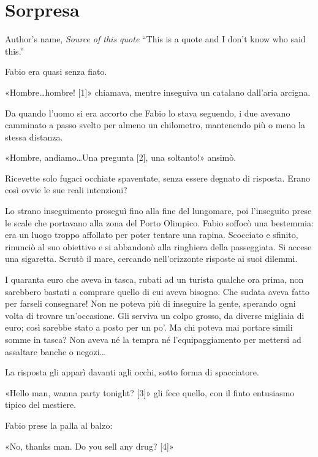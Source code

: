 \chapter{Sorpresa}

\begin{chapquote}{Author's name, \textit{Source of this quote}}
``This is a quote and I don't know who said this.''
\end{chapquote}



Fabio era quasi senza fiato.

«Hombre\ldots hombre! [1]» chiamava, mentre inseguiva un catalano dall'aria arcigna. 

Da quando l'uomo si era accorto che Fabio lo stava seguendo, i due avevano camminato a passo svelto per almeno un chilometro, mantenendo più o meno la stessa distanza.

«Hombre, andiamo\ldots Una pregunta [2], una soltanto!» ansimò. 

Ricevette solo fugaci occhiate spaventate, senza essere degnato di risposta. Erano così ovvie le sue reali intenzioni?

Lo strano inseguimento proseguì fino alla fine del lungomare, poi l'inseguito prese le scale che portavano alla zona del Porto Olimpico. Fabio soffocò una bestemmia: era un luogo troppo affollato per poter tentare una rapina. Scocciato e sfinito, rinunciò al suo obiettivo e si abbandonò alla ringhiera della passeggiata. Si accese una sigaretta. Scrutò il mare, cercando nell'orizzonte risposte ai suoi dilemmi.

I quaranta euro che aveva in tasca, rubati ad un turista qualche ora prima, non sarebbero bastati a comprare quello di cui aveva bisogno. Che sudata aveva fatto per farseli consegnare! Non ne poteva più di inseguire la gente, sperando ogni volta di trovare un'occasione. Gli serviva un colpo grosso, da diverse migliaia di euro; così sarebbe stato a posto per un po'. Ma chi poteva mai portare simili somme in tasca? Non aveva né la tempra né l'equipaggiamento per mettersi ad assaltare banche o negozi\ldots

La risposta gli apparì davanti agli occhi, sotto forma di spacciatore.

«Hello man, wanna party tonight? [3]» gli fece quello, con il finto entusiasmo tipico del mestiere.

Fabio prese la palla al balzo:

«No, thanks man. Do you sell any drug? [4]»


